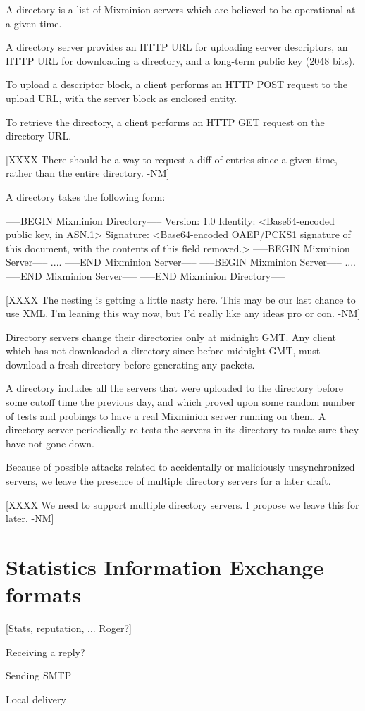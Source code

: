A directory is a list of Mixminion servers which are believed to
be operational at a given time.

A directory server provides an HTTP URL for uploading server
descriptors, an HTTP URL for downloading a directory, and a long-term
public key (2048 bits).

To upload a descriptor block, a client performs an HTTP POST request
to the upload URL, with the server block as enclosed entity.

To retrieve the directory, a client performs an HTTP GET request on
the directory URL.

[XXXX There should be a way to request a diff of entries since a given
time, rather than the entire directory. -NM]

A directory takes the following form:

-----BEGIN Mixminion Directory-----
Version: 1.0
Identity: <Base64-encoded public key, in ASN.1>
Signature: <Base64-encoded OAEP/PCKS1 signature of this document, with
     the contents of this field removed.>
-----BEGIN Mixminion Server-----
 ....
-----END Mixminion Server-----
-----BEGIN Mixminion Server-----
 ....
-----END Mixminion Server-----
-----END Mixminion Directory-----

[XXXX The nesting is getting a little nasty here.  This may be our
   last chance to use XML.  I'm leaning this way now, but I'd
   really like any ideas pro or con. -NM]

Directory servers change their directories only at midnight GMT.  Any
client which has not downloaded a directory since before midnight GMT,
must download a fresh directory before generating any packets.

A directory includes all the servers that were uploaded to the
directory before some cutoff time the previous day, and which proved
upon some random number of tests and probings to have a real Mixminion
server running on them.  A directory server periodically re-tests
the servers in its directory to make sure they have not gone down.

Because of possible attacks related to accidentally or maliciously
unsynchronized servers, we leave the presence of multiple directory
servers for a later draft.

[XXXX We need to support multiple directory servers. I propose we
   leave this for later. -NM]

\section{Statistics Information Exchange formats}

[Stats, reputation, ... Roger?]

Receiving a reply?

Sending SMTP

Local delivery


